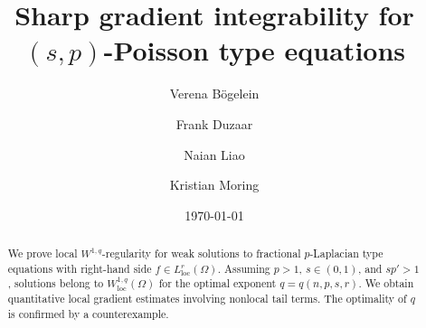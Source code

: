 \documentclass[10pt,letterpaper]{amsart}
\theoremstyle{definition}
\numberwithin{theorem}{section}
\numberwithin{equation}{section}
\newcommand{\1}{\ensuremath{\mathds{1}}}
\DeclareMathOperator{\loc}{loc}
\numberwithin{equation}{section}
\begin{document}
\renewcommand{\refname}{References} 
\renewcommand{\abstractname}{Abstract} 
\title[Sharp gradient integrability for $(s,p)$-Poisson type equations]{Sharp gradient integrability for\\ $(s,p)$-Poisson type equations}


\author[V. B\"ogelein]{Verena B\"{o}gelein}
\address{Verena B\"ogelein\\
Fachbereich Mathematik, Universit\"at Salzburg\\
Hellbrunner Str. 34, 5020 Salzburg, Austria}

\author[F. Duzaar]{Frank Duzaar}
\address{Frank Duzaar\\
Fachbereich Mathematik, Universit\"at Salzburg\\
Hellbrunner Str. 34, 5020 Salzburg, Austria}

\author[N. Liao]{Naian Liao}
\address{Naian Liao\\
Fachbereich Mathematik, Universit\"at Salzburg\\
Hellbrunner Str. 34, 5020 Salzburg, Austria}

\author[K.~Moring]{Kristian Moring}
\address{Kristian Moring\\
Fachbereich Mathematik, Universität Salzburg\\
Hellbrunner Str.~34, 5020 Salzburg, Austria}

\date{\today}


\begin{abstract}
We prove local $W^{1,q}$-regularity for weak solutions to fractional $p$-Laplacian type equations with right-hand side $f\in L^r_{\loc}(\Omega)$.
Assuming $p>1$, $s\in(0,1)$, and $sp'>1$, solutions belong to $W^{1,q}_{\loc}(\Omega)$ for the optimal exponent $q=q(n,p,s,r)$.
We obtain quantitative local gradient estimates involving nonlocal tail terms.
The optimality of $q$ is confirmed by a counterexample.
\end{abstract}


\makeatother

\maketitle

\tableofcontents
\end{document}

